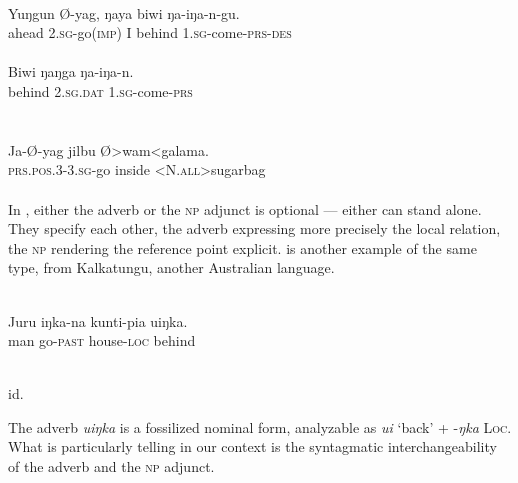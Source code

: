 \ea\label{ex:E64}
 \\
 \ea
 \gll Yuŋgun  Ø-yag,  ŋaya  biwi  ŋa-iŋa-n-gu.\\
  ahead  2.\textsc{sg}-go(\textsc{imp})  I  behind  1.\textsc{sg}-come-\textsc{prs}-\textsc{des}\\
\\
\ex
\gll  Biwi  ŋaŋga  ŋa-iŋa-n.\\
   behind  2.\textsc{sg}.\textsc{dat}  1.\textsc{sg}-come-\textsc{prs}\\
\\
\z
\z
\noindent \ea\label{ex:E65}
\\
\gll Ja-Ø-yag  jilbu  Ø{\textgreater}wam{\textless}galama.\\
 \textsc{prs}.\textsc{pos}.3-3.\textsc{sg}-go  inside  {\textless}N.\textsc{all}{\textgreater}sugarbag\\
\\
\z
\noindent In , either the adverb or the \textsc{np} adjunct is optional — either can stand alone. They specify each other, the adverb expressing more precisely the local relation, the \textsc{np} rendering the reference point explicit.  is another example of the same type, from Kalkatungu, another Australian language.

\ea\label{ex:E66}
 \\
\gll Juru  iŋka-na  kunti-pia  uiŋka.\\
man  go-\textsc{past}  house-\textsc{loc}  behind\\
\\
\z
\noindent %

\begin{exe} %
	\glt id.
\end{exe}


\noindent\label{page96}The adverb \textit{uiŋka} is a fossilized nominal form, analyzable as \textit{ui} ‘back’ + -\textit{ŋka} \textsc{Loc}. What is particularly telling in our context is the syntagmatic interchangeability of the adverb and the \textsc{np} adjunct.

